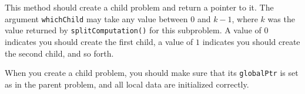 This method should create a child problem and return a pointer to it.  
The argument
\texttt{whichChild} may take any value between $0$ and $k-1$, where $k$
was the value returned by \texttt{splitComputation()} for this
subproblem.  
A value of $0$ indicates you should create the first child, a
value of $1$ indicates you should create the second child, and so
forth.  

When you create a child problem, you should make sure that its
\texttt{globalPtr} is set as in the parent problem, and all local
data are initialized correctly.




